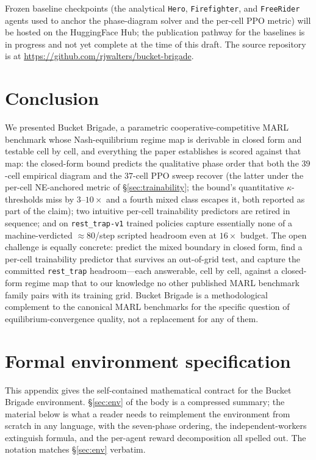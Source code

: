 \documentclass{anvil-paper}
\begin{document}
Frozen baseline checkpoints (the analytical \texttt{Hero},
\texttt{Firefighter}, and \texttt{FreeRider} agents used to anchor the
phase-diagram solver and the per-cell PPO metric) will be hosted on the
HuggingFace Hub; the publication pathway for the baselines is in progress
and not yet complete at the time of this draft. The source repository is at
\url{https://github.com/rjwalters/bucket-brigade}.

\section*{Conclusion}

We presented Bucket Brigade, a parametric cooperative-competitive MARL
benchmark whose Nash-equilibrium regime map is derivable in closed form
and testable cell by cell, and everything the paper establishes is
scored against that map: the closed-form bound predicts the qualitative
phase order that both the $39$-cell empirical diagram and the $37$-cell
PPO sweep recover (the latter under the per-cell NE-anchored metric of
\S\ref{sec:trainability}; the bound's quantitative
$\kappa$-thresholds miss by $3$--$10{\times}$ and a fourth
\textsf{mixed} class escapes it, both reported as part of the claim);
two intuitive per-cell trainability predictors are retired in sequence;
and on \texttt{rest\_trap-v1} trained policies capture essentially
none of a machine-verdicted ${\approx}80$/step scripted headroom even
at $16{\times}$ budget. The open challenge is equally concrete:
predict the \textsf{mixed} boundary in closed form, find a per-cell
trainability predictor that survives an out-of-grid test, and capture
the committed \texttt{rest\_trap} headroom---each answerable, cell by
cell, against a closed-form regime map that to our knowledge no other
published MARL benchmark family pairs with its training grid. Bucket
Brigade is a methodological complement to the canonical MARL benchmarks
for the specific question of equilibrium-convergence quality, not a
replacement for any of them.




\appendix

\section{Formal environment specification}
\label{app:envspec}

This appendix gives the self-contained mathematical contract for the Bucket
Brigade environment. \S\ref{sec:env} of the body is a compressed summary;
the material below is what a reader needs to reimplement the environment
from scratch in any language, with the seven-phase ordering, the
independent-workers extinguish formula, and the per-agent reward
decomposition all spelled out. The notation matches \S\ref{sec:env}
verbatim.
\end{document}
